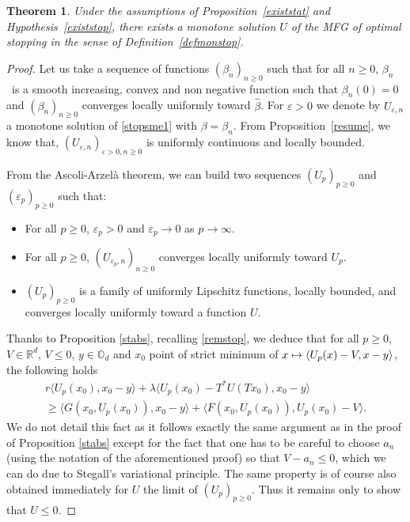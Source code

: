 \documentclass[JEP,XML,SOM,Unicode,NoEqCountersInSection,published]{cedram}
\newcommand\mto{\mathchoice{\longmapsto}{\mapsto}{\mapsto}{\mapsto}}
\let\epsilon\varepsilon
\newtheorem{Theorem}{Theorem}[section]
\theoremstyle{definition}
\begin{document}
\begin{Theorem}
Under the assumptions of Proposition~\ref{existstat} and Hypothesis~\ref{existstop}, there exists a monotone solution $U$ of the MFG of optimal stopping in the sense of Definition~\ref{defmonstop}.
\end{Theorem}
\begin{proof}
Let us take a sequence of functions $(\beta_n)_{n \geq 0}$ such that for all $n \geq 0$, $\beta_n$~is a smooth increasing, convex and non negative function such that $\beta_n(0)= 0$ and $(\beta_n)_{n \geq 0}$ converges locally uniformly toward $\hat{\beta}$. For $\epsilon > 0$ we denote by $U_{\epsilon,n}$ a monotone solution of \eqref{stopsme1} with $\beta = \beta_n$. From Proposition~\ref{resume}, we know that, $(U_{\epsilon,n})_{\epsilon> 0, n \geq 0}$ is uniformly continuous and locally bounded.

From the Ascoli-Arzelà theorem, we can build two sequences $(U_p)_{p \geq 0}$ and $(\epsilon_p)_{p \geq 0}$ such that:
\begin{itemize}
\item For all $p \geq 0$, $\epsilon_p > 0$ and $\epsilon_p \to 0$ as $p \to \infty$.
\item For all $p \geq 0$, $(U_{\epsilon_p,n})_{n \geq 0}$ converges locally uniformly toward $U_p$.
\item $(U_p)_{p \geq 0}$ is a family of uniformly Lipschitz functions, locally bounded, and converges locally uniformly toward a function $U$.
\end{itemize}
Thanks to Proposition \ref{stabs}, recalling \eqref{remstop}, we deduce that for all $p \geq 0$, $V \in \mathbb{R}^d$, $V \leq 0$, $y \in \mathbb{O}_d$ and $x_0$ point of strict minimum of $x \mto \langle U_p(x)-V, x-y\rangle$, the following holds
\begin{multline*}
r \langle U_p(x_0), x_0-y \rangle+\lambda \langle U_p(x_0)-T^*U(Tx_0),x_0-y\rangle \\
\geq
\langle G(x_0,U_p(x_0)), x_0- y \rangle+\langle F(x_0,U_p(x_0)), U_p(x_0)-V \rangle.
\end{multline*}
We do not detail this fact as it follows exactly the same argument as in the proof of Proposition \ref{stabs} except for the fact that one has to be careful to choose $a_n$ (using the notation of the aforementioned proof) so that $V-a_n \leq 0$, which we can do due to Stegall's variational principle. The same property is of course also obtained immediately for $U$ the limit of $(U_p)_{p \geq 0}$. Thus it remains only to show that $U \leq 0$.


\end{proof}
\end{document}
